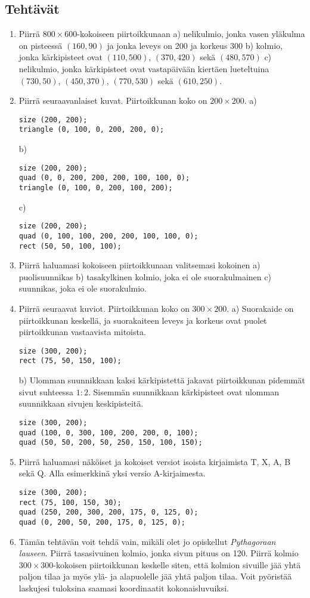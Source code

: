\documentclass[11pt]{article}
\begin{document}
\subsection*{Tehtävät}
\label{sec:org034a637}
\begin{enumerate}
\item Piirrä \(800\times 600\)-kokoiseen piirtoikkunaan 
a) nelikulmio, jonka vasen yläkulma on pisteessä \((160, 90)\) ja
   jonka leveys on 200 ja korkeus 300
b) kolmio, jonka kärkipisteet ovat \((110, 500)\), \((370, 420)\)
   sekä \((480, 570)\)
c) nelikulmio, jonka kärkipisteet ovat vastapäivään kiertäen
   lueteltuina \((730, 50)\), \((450, 370)\), \((770, 530)\)
   sekä \((610, 250)\).
\item Piirrä seuraavanlaiset kuvat. Piirtoikkunan koko on \(200\times 200.\)
a) 
\begin{verbatim}
size (200, 200);
triangle (0, 100, 0, 200, 200, 0);
\end{verbatim}
b) 
\begin{verbatim}
size (200, 200);
quad (0, 0, 200, 200, 200, 100, 100, 0);
triangle (0, 100, 0, 200, 100, 200);
\end{verbatim}
c) 
\begin{verbatim}
size (200, 200);
quad (0, 100, 100, 200, 200, 100, 100, 0);
rect (50, 50, 100, 100);
\end{verbatim}
\item Piirrä haluamasi kokoiseen piirtoikkunaan valitsemasi kokoinen
a) puolisuunnikas
b) tasakylkinen kolmio, joka ei ole suorakulmainen
c) suunnikas, joka ei ole suorakulmio.
\item Piirrä seuraavat kuviot. Piirtoikkunan koko on \(300\times 200.\)
a) Suorakaide on piirtoikkunan keskellä, ja suorakaiteen leveys
   ja korkeus ovat puolet piirtoikkunan vastaavista mitoista.
\begin{verbatim}
size (300, 200);
rect (75, 50, 150, 100);
\end{verbatim}
b) Ulomman suunnikkaan kaksi kärkipistettä jakavat piirtoikkunan
   pidemmät sivut suhteessa \(1:2.\) Sisemmän suunnikkaan
   kärkipisteet ovat ulomman suunnikkaan sivujen keskipisteitä.
\begin{verbatim}
size (300, 200);
quad (100, 0, 300, 100, 200, 200, 0, 100);
quad (50, 50, 200, 50, 250, 150, 100, 150);
\end{verbatim}
\item Piirrä haluamasi näköiset ja kokoiset versiot isoista kirjaimista
T, X, A, B sekä Q. Alla esimerkkinä yksi versio
A-kirjaimesta.
\begin{verbatim}
size (300, 200);
rect (75, 100, 150, 30);
quad (250, 200, 300, 200, 175, 0, 125, 0);
quad (0, 200, 50, 200, 175, 0, 125, 0);
\end{verbatim}
\item Tämän tehtävän voit tehdä vain, mikäli olet jo opiskellut
\emph{Pythagoraan lauseen}. Piirrä tasasivuinen kolmio, jonka sivun
pituus on 120. Piirrä kolmio \(300\times 300\)-kokoisen
piirtoikkunan keskelle siten, että kolmion sivuille jää yhtä
paljon tilaa ja myös ylä- ja alapuolelle jää yhtä paljon
tilaa. Voit pyöristää laskujesi tuloksina saamasi koordinaatit
kokonaisluvuiksi.
\end{enumerate}
\end{document}
